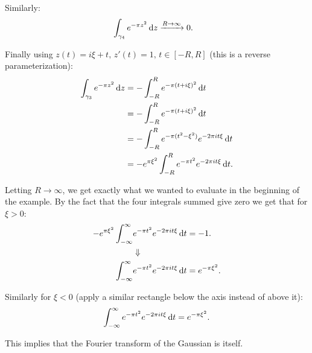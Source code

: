 \begin{example}
Similarly:
\begin{align*}
    &\int_{\gamma_4} e^{-\pi z^2} \dif z \xrightarrow{R\to \infty} 0.
\end{align*}

Finally using $z(t) = i\xi +t, \, z'(t) = 1,  \, t \in [-R,R]$ (this is a reverse parameterization):
\begin{align*}
    \int_{\gamma_3} e^{-\pi z^2} \dif z &= - \int_{-R}^R e^{-\pi (t+i\xi)^2}  \dif t\\
    &= - \int_{-R}^R e^{-\pi (t+i\xi)^2}  \dif t\\
    & = - \int_{-R}^R e^{-\pi (t^2-\xi^2)} e^{-2\pi i t \xi}  \dif t\\
    &= - e^{\pi \xi ^2 } \int_{-R}^R e^{-\pi t^2} e^{-2\pi i t \xi}  \dif t.
\end{align*}

Letting $R \to \infty$, we get exactly what we wanted to evaluate in the beginning of the example. By the fact that the four integrals summed give zero we get that for $ \xi > 0$:
\begin{align*}
    - e^{\pi \xi ^2 } \int_{-\infty}^\infty &e^{-\pi t^2} e^{-2\pi i t \xi}  \dif t = -1.\\
    &\Downarrow\\
    \int_{-\infty}^\infty &e^{-\pi t^2} e^{-2\pi i t \xi}  \dif t = e^{-\pi \xi ^2 }.
\end{align*}

Similarly for $\xi < 0$ (apply a similar rectangle below the axis instead of above it):
\begin{align*}
    \int_{-\infty}^\infty e^{-\pi t^2} e^{-2\pi i t \xi}  \dif t = e^{-\pi \xi ^2 }.
\end{align*}

This implies that the Fourier transform of the Gaussian is itself.

\end{example}
